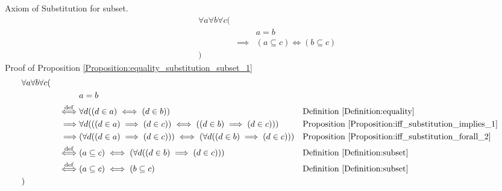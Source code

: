 \begin{prop}
\label{Proposition:equality_substitution_subset_1}
Axiom of Substitution for subset.
\begin{align*}
& \forall a \forall b \forall c ( \\
& & & a = b \\
& & \implies & (a \subseteq c) \iff (b \subseteq c) \\
& )
\end{align*}
Proof of Proposition \ref{Proposition:equality_substitution_subset_1}
\begin{align*}
& \forall a \forall b \forall c ( \\
& & & a = b \\
& & \overset{\operatorname{def}}{\iff} & \forall d ((d \in a) \iff (d \in b))
& & \text{Definition \ref{Definition:equality}} \\
& & \implies & \forall d (((d \in a) \implies (d \in c)) \iff ((d \in b) \implies (d \in c)))
& & \text{Proposition \ref{Proposition:iff_substitution_implies_1}} \\
& & \implies & (\forall d ((d \in a) \implies (d \in c))) \iff (\forall d ((d \in b) \implies (d \in c)))
& & \text{Proposition \ref{Proposition:iff_substitution_forall_2}} \\
& & \overset{\operatorname{def}}{\iff} & (a \subseteq c) \iff (\forall d ((d \in b) \implies (d \in c)))
& & \text{Definition \ref{Definition:subset}} \\
& & \overset{\operatorname{def}}{\iff} & (a \subseteq c) \iff (b \subseteq c)
& & \text{Definition \ref{Definition:subset}} \\
& )
\end{align*}
\end{prop}


